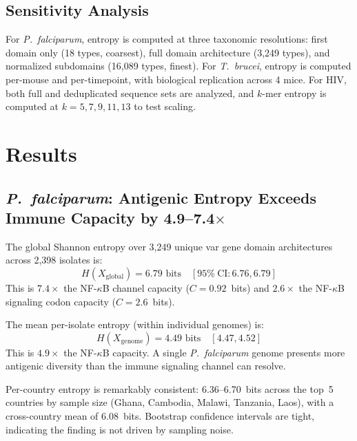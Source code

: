 \documentclass[twocolumn,10pt]{article}
\begin{document}
\subsection{Sensitivity Analysis}

For \textit{P.~falciparum}, entropy is computed at three taxonomic resolutions: first domain only (18 types, coarsest), full domain architecture (3,249 types), and normalized subdomains (16,089 types, finest).  For \textit{T.~brucei}, entropy is computed per-mouse and per-timepoint, with biological replication across 4 mice.  For HIV, both full and deduplicated sequence sets are analyzed, and $k$-mer entropy is computed at $k = 5, 7, 9, 11, 13$ to test scaling.

\section{Results}
\label{sec:results}

\subsection{\textit{P.~falciparum}: Antigenic Entropy Exceeds Immune Capacity by 4.9--7.4$\times$}

The global Shannon entropy over 3,249 unique var gene domain architectures across 2,398 isolates is:
\begin{equation}
H(X_{\text{global}}) = 6.79 \text{~bits} \quad [95\%~\text{CI}: 6.76, 6.79]
\end{equation}
This is $7.4\times$ the NF-$\kappa$B channel capacity ($C = 0.92$~bits) and $2.6\times$ the NF-$\kappa$B signaling codon capacity ($C = 2.6$~bits).

The mean per-isolate entropy (within individual genomes) is:
\begin{equation}
H(X_{\text{genome}}) = 4.49 \text{~bits} \quad [4.47, 4.52]
\end{equation}
This is $4.9\times$ the NF-$\kappa$B capacity.  A single \textit{P.~falciparum} genome presents more antigenic diversity than the immune signaling channel can resolve.

Per-country entropy is remarkably consistent: 6.36--6.70~bits across the top~5 countries by sample size (Ghana, Cambodia, Malawi, Tanzania, Laos), with a cross-country mean of 6.08~bits.  Bootstrap confidence intervals are tight, indicating the finding is not driven by sampling noise.
\end{document}
